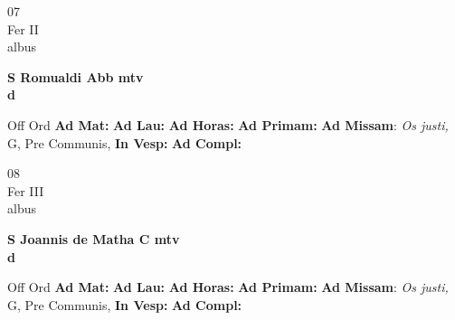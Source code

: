 \documentclass[10pt, openany]{book}
\begin{document}
    \begin{center}
        \begin{minipage}{3.5in}
            \vspace{2em}
            \begin{minipage}{0.5in}
                {\Huge 07} \\
                {\normalsize Fer II} \\
                {\normalsize albus}
            \end{minipage}
            \begin{minipage}{3.0in}
                \textbf{ \large S Romualdi Abb mtv \\
                \textnormal{\normalsize d}} \\ 
            \end{minipage}
            \begin{justify}Off Ord
                \textbf{Ad Mat: }
                \textbf{Ad Lau: }
                \textbf{Ad Horas: }
                \textbf{Ad Primam: }\textbf{Ad Missam}: \textit{Os justi,} G, Pre Communis,  
                \textbf{In Vesp: }
                \textbf{Ad Compl: }
            \end{justify}
        \end{minipage}
    \end{center}

    \begin{center}
        \begin{minipage}{3.5in}
            \vspace{2em}
            \begin{minipage}{0.5in}
                {\Huge 08} \\
                {\normalsize Fer III} \\
                {\normalsize albus}
            \end{minipage}
            \begin{minipage}{3.0in}
                \textbf{ \large S Joannis de Matha C mtv \\
                \textnormal{\normalsize d}} \\ 
            \end{minipage}
            \begin{justify}Off Ord
                \textbf{Ad Mat: }
                \textbf{Ad Lau: }
                \textbf{Ad Horas: }
                \textbf{Ad Primam: }\textbf{Ad Missam}: \textit{Os justi,} G, Pre Communis,  
                \textbf{In Vesp: }
                \textbf{Ad Compl: }
            \end{justify}
        \end{minipage}
    \end{center}
\end{document}
